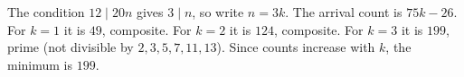 The condition $12\mid 20n$ gives $3\mid n$, so write $n=3k$. The arrival count is $75k-26$. For $k=1$ it is $49$, composite. For $k=2$ it is $124$, composite. For $k=3$ it is $199$, prime (not divisible by $2,3,5,7,11,13$). Since counts increase with $k$, the minimum is $\boxed{199}$.
